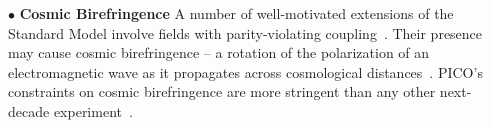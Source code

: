 \documentclass[PICOAPC.tex]{subfiles}
\begin{document}
$\bullet$ {\bf Cosmic Birefringence} \hspace{0.1in}
A number of well-motivated extensions of the Standard Model involve fields with parity-violating coupling~\citep{Freese:1990rb,Frieman:1995pm,Carroll:1998zi,Kaloper:2005aj,Carroll:1998zi,2008PhRvL.101n1101C,Gluscevic:2010vv}. Their presence may cause cosmic birefringence -- a rotation of the polarization of an electromagnetic wave as it propagates across cosmological distances~\cite{Harari:1992ea,Carroll:1989vb,Carroll:1998zi}. PICO's constraints on cosmic birefringence are more stringent than any other next-decade experiment~\cite{pogosian_2019}. 
\end{document}
